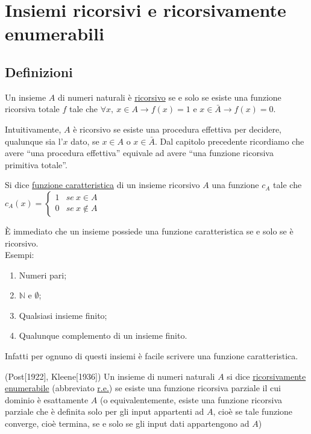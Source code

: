 \chapter{Insiemi ricorsivi e ricorsivamente enumerabili}


\section{Definizioni}

\begin{defi}
Un insieme $A$ di numeri naturali \`e \underline{ricorsivo} se e solo se esiste una
funzione ricorsiva totale $f$ tale che $\forall x,\ x\in A\rightarrow f(x)=1\mbox{\ e\ }x\in\bar{A}\rightarrow f(x)=0$.
\end{defi}

Intuitivamente, $A$ \`e ricorsivo se esiste una procedura effettiva
per decidere, qualunque sia l'$x$ dato, se $x\in A$ o $x\in\bar{A}$.
Dal capitolo precedente ricordiamo che avere "`una procedura effettiva"' equivale ad avere "`una funzione ricorsiva primitiva totale"'.

\begin{defi}Si dice \underline{funzione caratteristica} di un insieme ricorsivo $A$ una funzione $c_A$ tale che\\

$c_A(x)=\left\{ \begin{array}{cc}
1 & se\ x\in A\\
0 & se\ x\notin A\end{array}\right.$
\end{defi}

\`E immediato che un insieme possiede una funzione caratteristica se e solo se \`e ricorsivo.\\
Esempi:
\begin{enumerate}
\item Numeri pari;
\item $\mathbb{N}$ e $\emptyset$;
\item Qualsiasi insieme finito;
\item Qualunque complemento di un insieme finito.
\end{enumerate}
Infatti per ognuno di questi insiemi \`e facile scrivere una funzione caratteristica.

\begin{defi}
(Post[1922], Kleene[1936]) Un insieme di numeri naturali $A$ si dice
\underline{ricorsivamente enumerabile} (abbreviato \underline{r.e.}) se esiste
una funzione ricorsiva parziale il cui dominio \`e esattamente $A$
(o equivalentemente, esiste una funzione ricorsiva parziale che \`e definita
solo per gli input appartenti ad $A$, cio\`e se tale funzione converge, cio\`e termina, se e solo se gli input dati appartengono ad $A$)
\end{defi}

